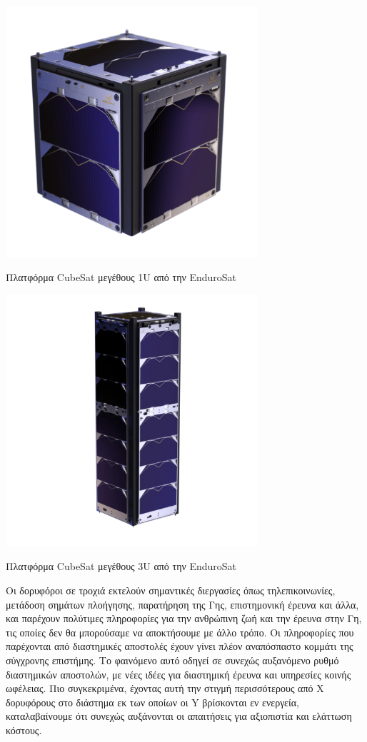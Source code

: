 \documentclass[a4paper,nobib,justified]{tufte-book}
\begin{document}
\begin{marginfigure}
	\includegraphics[width=0.7\textwidth]{media/images/endurosat-platforms/1u.png}
	\caption{Πλατφόρμα CubeSat μεγέθους 1U από την EnduroSat \parencite{1UEndurosat}}
\end{marginfigure}

\begin{marginfigure}
	\includegraphics[width=0.7\textwidth]{media/images/endurosat-platforms/3u.png}
	\caption{Πλατφόρμα CubeSat μεγέθους 3U από την EnduroSat \parencite{3UEndurosat}}
\end{marginfigure}

Οι δορυφόροι σε τροχιά εκτελούν σημαντικές διεργασίες όπως τηλεπικοινωνίες, μετάδοση σημάτων πλοήγησης, παρατήρηση της Γης, επιστημονική έρευνα και άλλα, και παρέχουν πολύτιμες πληροφορίες για την ανθρώπινη ζωή και την έρευνα στην Γη, τις οποίες δεν θα μπορούσαμε να αποκτήσουμε με άλλο τρόπο. Οι πληροφορίες που παρέχονται από διαστημικές αποστολές έχουν γίνει πλέον αναπόσπαστο κομμάτι της σύγχρονης επιστήμης. Το φαινόμενο αυτό οδηγεί σε συνεχώς αυξανόμενο ρυθμό διαστημικών αποστολών, με νέες ιδέες για διαστημική έρευνα και υπηρεσίες κοινής ωφέλειας. Πιο συγκεκριμένα, έχοντας αυτή την στιγμή περισσότερους από X δορυφόρους στο διάστημα εκ των οποίων οι Y βρίσκονται εν ενεργεία, καταλαβαίνουμε ότι συνεχώς αυξάνονται οι απαιτήσεις για αξιοπιστία και ελάττωση κόστους. %
\end{document}
